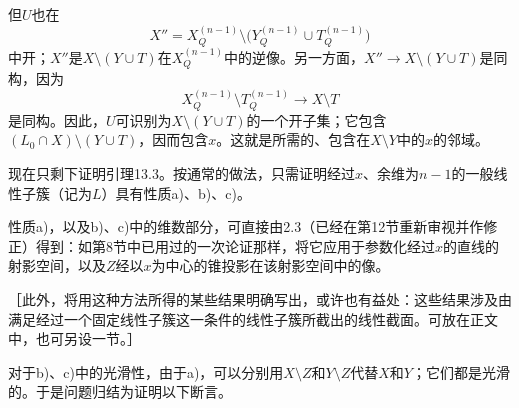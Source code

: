 但$U$也在
\[
X''=X_Q^{(n-1)}\setminus
\bigl(Y_Q^{(n-1)}\cup T_Q^{(n-1)}\bigr)
\]
中开；$X''$是$X\setminus(Y\cup T)$在$X_Q^{(n-1)}$中的逆像。另一方面，$X''\to X\setminus(Y\cup T)$是同构，因为
\[
X_Q^{(n-1)}\setminus T_Q^{(n-1)}\longrightarrow X\setminus T
\]
是同构。因此，$U$可识别为$X\setminus(Y\cup T)$的一个开子集；它包含$(L_0\cap X)\setminus(Y\cup T)$，因而包含$x$。这就是所需的、包含在$X\setminus Y$中的$x$的邻域。


现在只剩下证明引理13.3。按通常的做法，只需证明经过$x$、余维为$n-1$的一般线性子簇（记为$L$）具有性质a)、b)、c)。

性质a)，以及b)、c)中的维数部分，可直接由2.3（已经在第12节重新审视并作修正）得到：如第8节中已用过的一次论证那样，将它应用于参数化经过$x$的直线的射影空间，以及$Z$经以$x$为中心的锥投影在该射影空间中的像。

［此外，将用这种方法所得的某些结果明确写出，或许也有益处：这些结果涉及由满足经过一个固定线性子簇这一条件的线性子簇所截出的线性截面。可放在正文中，也可另设一节。］

对于b)、c)中的光滑性，由于a)，可以分别用$X\setminus Z$和$Y\setminus Z$代替$X$和$Y$；它们都是光滑的。于是问题归结为证明以下断言。

